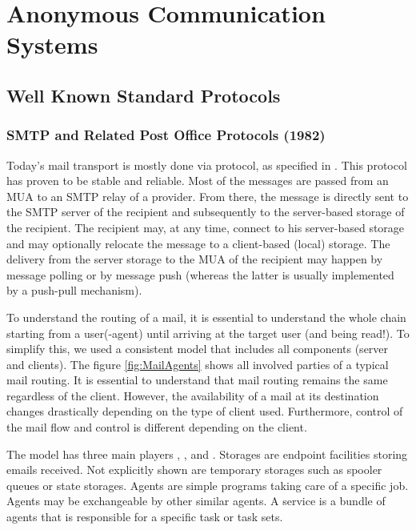 
\part{Anonymous Communication Systems}\label{sec:systems}
\chapter{Well Known Standard Protocols}
\section*{SMTP and Related Post Office Protocols (1982)}
Today's mail transport is mostly done via  protocol, as specified in \cite{rfc5321}. This protocol has proven to be stable and reliable. Most of the messages are passed from an MUA to an SMTP relay of a provider. From there, the message is directly sent to the SMTP server of the recipient and subsequently to the server-based storage of the recipient. The recipient may, at any time, connect to his server-based storage and may optionally relocate the message to a client-based (local) storage. The delivery from the server storage to the MUA of the recipient may happen by message polling or by message push (whereas the latter is usually implemented by a push-pull mechanism).

To understand the routing of a mail, it is essential to understand the whole chain starting from a user(-agent) until arriving at the target user (and being read!). To simplify this, we used a consistent model that includes all components (server and clients). The figure \ref{fig:MailAgents} shows all involved parties of a typical mail routing. It is essential to understand that mail routing remains the same regardless of the client. However, the availability of a mail at its destination changes drastically depending on the type of client used. Furthermore, control of the mail flow and control is different depending on the client.

The model has three main players , , and . Storages are endpoint facilities storing emails received. Not explicitly shown are temporary storages such as spooler queues or state storages. Agents are simple programs taking care of a specific job. Agents may be exchangeable by other similar agents. A service is a bundle of agents that is responsible for a specific task or task sets.

